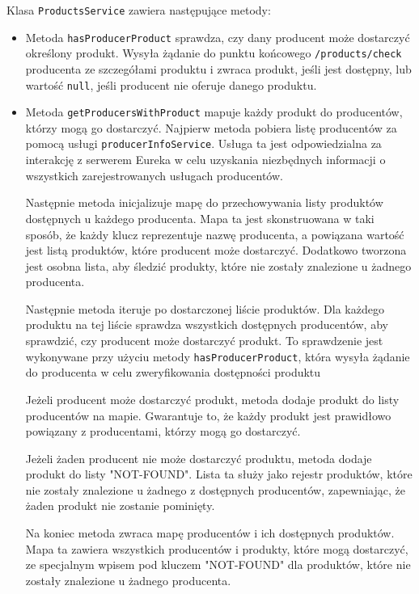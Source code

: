 Klasa \verb|ProductsService| zawiera następujące metody:
\begin{itemize}
    \item Metoda \verb|hasProducerProduct| sprawdza, czy dany producent może dostarczyć określony produkt. Wysyła żądanie  do punktu końcowego \verb|/products/check| producenta ze szczegółami produktu i zwraca produkt, jeśli jest dostępny, lub wartość \verb|null|, jeśli producent nie oferuje danego produktu.
    \item Metoda \verb|getProducersWithProduct| mapuje każdy produkt do producentów, którzy mogą go dostarczyć.
    Najpierw metoda pobiera listę producentów za pomocą usługi \verb|producerInfoService|. Usługa ta jest odpowiedzialna za interakcję z serwerem Eureka w celu uzyskania niezbędnych informacji o wszystkich zarejestrowanych usługach producentów.

    Następnie metoda inicjalizuje mapę do przechowywania listy produktów dostępnych u każdego producenta. Mapa ta jest skonstruowana w taki sposób, że każdy klucz reprezentuje nazwę producenta, a powiązana wartość jest listą produktów, które producent może dostarczyć. Dodatkowo tworzona jest osobna lista, aby śledzić produkty, które nie zostały znalezione u żadnego producenta.

    Następnie metoda iteruje po dostarczonej liście produktów. Dla każdego produktu na tej liście sprawdza wszystkich dostępnych producentów, aby sprawdzić, czy producent może dostarczyć produkt. To sprawdzenie jest wykonywane przy użyciu metody \verb|hasProducerProduct|, która wysyła żądanie do producenta w celu zweryfikowania dostępności produktu

    Jeżeli producent może dostarczyć produkt, metoda dodaje produkt do listy producentów na mapie. Gwarantuje to, że każdy produkt jest prawidłowo powiązany z producentami, którzy mogą go dostarczyć.

    Jeżeli żaden producent nie może dostarczyć produktu, metoda dodaje produkt do listy "NOT-FOUND". Lista ta służy jako rejestr produktów, które nie zostały znalezione u żadnego z dostępnych producentów, zapewniając, że żaden produkt nie zostanie pominięty.

    Na koniec metoda zwraca mapę producentów i ich dostępnych produktów. Mapa ta zawiera wszystkich producentów i produkty, które mogą dostarczyć, ze specjalnym wpisem pod kluczem "NOT-FOUND" dla produktów, które nie zostały znalezione u żadnego producenta.
\end{itemize}

